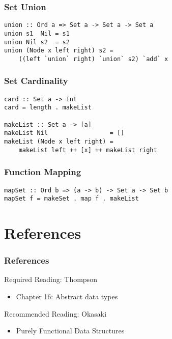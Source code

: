 \documentclass[dvipsnames]{beamer}
\theoremstyle{plain}
\begin{document}
\begin{frame}[fragile]
  \frametitle{Set Union}

  \begin{lstlisting}[deletekeywords={union}]
union :: Ord a => Set a -> Set a -> Set a
union s1  Nil = s1
union Nil s2  = s2
union (Node x left right) s2 =
    ((left `union` right) `union` s2) `add` x
  \end{lstlisting}
\end{frame}

\begin{frame}[fragile]
  \frametitle{Set Cardinality}

  \begin{lstlisting}
card :: Set a -> Int
card = length . makeList

makeList :: Set a -> [a]
makeList Nil                 = []
makeList (Node x left right) =
    makeList left ++ [x] ++ makeList right
  \end{lstlisting}
\end{frame}

\begin{frame}[fragile]
  \frametitle{Function Mapping}

  \begin{lstlisting}
mapSet :: Ord b => (a -> b) -> Set a -> Set b
mapSet f = makeSet . map f . makeList
  \end{lstlisting}
\end{frame}

\section*{References}

\begin{frame}
  \frametitle{References}

  \begin{block}{Required Reading: Thompson}
    \begin{itemize}
      \item Chapter 16: \alert{Abstract data types}
    \end{itemize}
  \end{block}

  \begin{block}{Recommended Reading: Okasaki}
    \begin{itemize}
      \item Purely Functional Data Structures
    \end{itemize}
  \end{block}
\end{frame}
\end{document}
